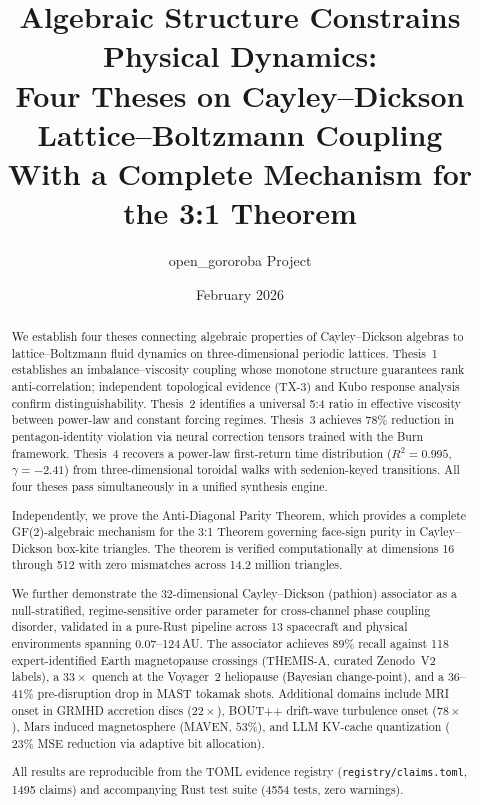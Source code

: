 \documentclass[12pt]{article}
\title{\textbf{Algebraic Structure Constrains Physical Dynamics: \\
Four Theses on Cayley--Dickson Lattice--Boltzmann Coupling}\\[0.5em]
\large With a Complete Mechanism for the 3:1 Theorem}
\author{open\_gororoba Project}
\date{February 2026}
\theoremstyle{definition}
\theoremstyle{plain}
\theoremstyle{remark}
\begin{document}
\maketitle

\begin{abstract}
We establish four theses connecting algebraic properties of Cayley--Dickson
algebras to lattice--Boltzmann fluid dynamics on three-dimensional periodic
lattices.  Thesis~1 establishes an imbalance--viscosity coupling whose
monotone structure guarantees rank anti-correlation; independent topological
evidence (TX-3) and Kubo response analysis confirm distinguishability.
Thesis~2 identifies a universal 5:4 ratio in effective viscosity between
power-law and constant forcing regimes.  Thesis~3 achieves 78\% reduction in
pentagon-identity violation via neural correction tensors trained with the
Burn framework.  Thesis~4 recovers a power-law first-return time distribution
($R^2 = 0.995$, $\gamma = -2.41$) from three-dimensional toroidal walks
with sedenion-keyed transitions.  All four theses pass simultaneously in a
unified synthesis engine.

Independently, we prove the Anti-Diagonal Parity Theorem, which provides a
complete GF(2)-algebraic mechanism for the 3:1 Theorem governing face-sign
purity in Cayley--Dickson box-kite triangles.  The theorem is verified
computationally at dimensions 16 through 512 with zero mismatches across
14.2 million triangles.

We further demonstrate the 32-dimensional Cayley--Dickson (pathion) associator
as a null-stratified, regime-sensitive order parameter for cross-channel
phase coupling disorder, validated in a pure-Rust pipeline across
13 spacecraft and physical environments spanning 0.07--124\,AU.
The associator achieves $89\%$ recall against 118 expert-identified
Earth magnetopause crossings (THEMIS-A, curated Zenodo~V2 labels),
a $33\times$ quench at the Voyager~2 heliopause (Bayesian change-point),
and a $36$--$41\%$ pre-disruption drop in MAST tokamak shots.
Additional domains include MRI onset in GRMHD accretion discs ($22\times$),
BOUT$+$$+$ drift-wave turbulence onset ($78\times$), Mars induced
magnetosphere (MAVEN, $53\%$), and LLM KV-cache quantization
($23\%$ MSE reduction via adaptive bit allocation).

All results are reproducible from the TOML evidence registry
(\texttt{registry/claims.toml}, 1495 claims) and accompanying Rust test suite
(4554 tests, zero warnings).
\end{abstract}
\end{document}
